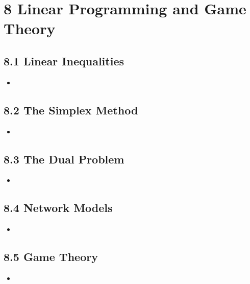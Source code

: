 \chapter{8 Linear Programming and Game Theory}

\section{8.1 Linear Inequalities}
\begin{itemize}
  \item []


\end{itemize}

\section{8.2 The Simplex Method}
\begin{itemize}
  \item []


\end{itemize}

\section{8.3 The Dual Problem}
\begin{itemize}
  \item []


\end{itemize}

\section{8.4 Network Models}
\begin{itemize}
  \item []


\end{itemize}

\section{8.5 Game Theory}
\begin{itemize}
  \item []


\end{itemize}
